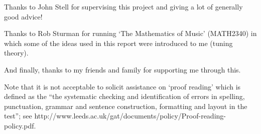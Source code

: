 Thanks to John Stell for supervising this project and giving a lot of generally
good advice!

Thanks to Rob Sturman for running `The Mathematics of Music' (MATH2340) in which
some of the ideas used in this report were introduced to me (tuning theory).

And finally, thanks to my friends and family for supporting me through this.

\vspace{1cm}

Note that it is not acceptable to solicit assistance on `proof reading' which is
defined as the ``the systematic checking and identification of errors in
spelling, punctuation, grammar and sentence construction, formatting and layout
in the test''; see http://www.leeds.ac.uk/gat/documents/policy/Proof-reading-policy.pdf.

